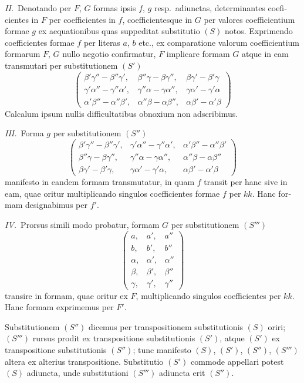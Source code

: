 \documentclass[12pt,a4paper]{article}
\theoremstyle{plain}
\theoremstyle{definition}
\theoremstyle{remark}
\begin{document}
\begin{otherlanguage}{latin}
\textit{II.}\ Denotando per $F$, $G$ formas ipsis $f$, $g$ resp.\ adiunctas, determinantes coeficientes in $F$ per coefficientes in $f$, coefficientesque in $G$ per valores coefficientium formae $g$ ex aequationibus quas suppeditat substitutio $(S)$ notos. Exprimendo coefficientes formae $f$ per literas $a$, $b$ etc., ex comparatione valorum coefficientium formarum $F$, $G$ nullo negotio confirmatur, $F$ implicare formam $G$ atque in eam transmutari per substitutionem $(S')$
\[
\begin{pmatrix}
\beta'\gamma'' - \beta''\gamma', & \beta''\gamma - \beta\gamma'', & \beta\gamma' - \beta'\gamma \\
\gamma'\alpha'' - \gamma''\alpha', & \gamma''\alpha - \gamma\alpha'', & \gamma\alpha' - \gamma'\alpha \\
\alpha'\beta'' - \alpha''\beta', & \alpha''\beta - \alpha\beta'', & \alpha\beta' - \alpha'\beta
\end{pmatrix}
\]
Calcalum ipsum nullis difficultatibus obnoxium non adscribimus.

\textit{III.}\ Forma $g$ per substitutionem $(S'')$
\[
\begin{pmatrix}
\beta'\gamma'' - \beta''\gamma', & \gamma'\alpha'' - \gamma''\alpha', & \alpha'\beta'' - \alpha''\beta' \\
\beta''\gamma - \beta\gamma'', & \gamma''\alpha - \gamma\alpha'', & \alpha''\beta - \alpha\beta'' \\
\beta\gamma' - \beta'\gamma, & \gamma\alpha' - \gamma'\alpha, & \alpha\beta' - \alpha'\beta
\end{pmatrix}
\]
manifesto in eandem formam transmutatur, in quam $f$ transit per hanc sive in eam, quae oritur multiplicando singulos coefficientes formae $f$ per $kk$. Hanc formam designabimus per $f'$.

\textit{IV.}\ Prorsus simili modo probatur, formam $G$ per substitutionem $(S''')$
\[
\begin{pmatrix}
a, & a', & a'' \\
b, & b', & b'' \\
\alpha, & \alpha', & \alpha'' \\
\beta, & \beta', & \beta'' \\
\gamma, & \gamma', & \gamma''
\end{pmatrix}
\]
transire in formam, quae oritur ex $F$, multiplicando singulos coefficientes per $kk$. Hanc formam exprimemus per $F'$.

Substitutionem $(S'')$ dicemus per transpositionem substitutionis $(S)$ oriri; $(S''')$ rursus prodit ex transpositione substitutionis $(S')$, atque $(S')$ ex transpositione substitutionis $(S'')$; tunc manifesto $(S)$, $(S')$, $(S'')$, $(S''')$ altera ex alterius transpositione. Substitutio $(S')$ commode appellari potest $(S)$ adiuncta, unde substitutioni $(S''')$ adiuncta erit $(S'')$.


\end{otherlanguage}
\end{document}
